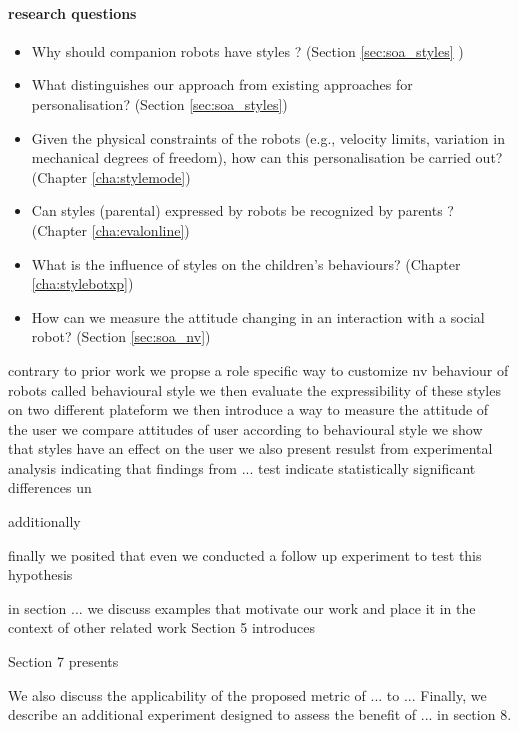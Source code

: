 \documentclass[smallextended]{svjour3}
\begin{document}
\paragraph{research questions}
\begin{itemize}[noitemsep,nolistsep]
	\item Why should companion robots have styles ? (Section \ref{sec:soa_styles} )
	\item What distinguishes our approach from existing approaches for personalisation? (Section \ref{sec:soa_styles})
	\item Given the physical constraints of the robots (e.g., velocity limits, variation in mechanical degrees of freedom), how can this personalisation be carried out?(Chapter \ref{cha:stylemode})
	\item Can styles (parental) expressed by robots be recognized by parents ? (Chapter \ref{cha:evalonline})
	\item What is the influence of styles on the children's behaviours? (Chapter \ref{cha:stylebotxp})
	\item How can we measure the attitude changing in an interaction with a social robot? (Section \ref{sec:soa_nv})
	\end{itemize}


contrary to prior work we propse a role specific way to customize nv behaviour of robots called behavioural style
we then evaluate the expressibility of these styles on two different plateform 
we then introduce a way to measure the attitude of the user
we compare attitudes of user according to behavioural style
we show that styles have an effect on the user
we also present resulst from experimental analysis indicating that 
findings from ... test indicate  statistically significant differences un 

additionally

finally we posited that even 
we conducted a follow up experiment to test this hypothesis

in section ... we discuss examples that motivate our work and place it in the context of other related work
Section 5 introduces

Section 7 presents 

We also discuss the applicability of the proposed metric of ... to ...
Finally, we describe an additional experiment designed to assess the benefit of ... in section 8.
\end{document}
